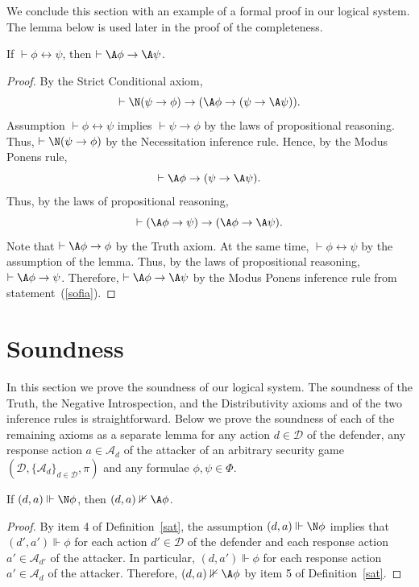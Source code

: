 \documentclass[letterpaper]{article}
\begin{document}
We conclude this section with an example of a formal proof in our logical system. The lemma below is used later in the proof of the completeness.

\begin{lemma}\label{biconditional lemma}
If $\vdash\phi\leftrightarrow\psi$, then $\vdash\A\phi\to\A\psi$.
\end{lemma}
\begin{proof}
By the Strict Conditional axiom,
$$
\vdash \N(\psi\to\phi)\to(\A\phi\to(\psi\to \A\psi)).
$$
Assumption  $\vdash \phi\leftrightarrow \psi$ implies $\vdash \psi\to \phi$ by the laws of propositional reasoning. Thus, $\vdash \N(\psi\to \phi)$ by the Necessitation inference rule. Hence, by the Modus Ponens rule,
$$
\vdash \A\phi\to(\psi\to \A\psi).
$$
Thus, by the laws of propositional reasoning,
\begin{equation}\label{sofia}
\vdash (\A\phi\to\psi)\to (\A\phi\to \A\psi).
\end{equation}
Note that $\vdash \A\phi\to\phi$ by the Truth axiom. At the same time, $\vdash \phi\leftrightarrow \psi$ by the assumption of the lemma. Thus, by the laws of propositional reasoning, $\vdash \A\phi\to\psi$. Therefore,
$
\vdash \A\phi\to \A\psi
$
by the Modus Ponens inference rule from statement~(\ref{sofia}).
\end{proof}

\section{Soundness}

In this section we prove the soundness of our logical system. The soundness of the Truth, the Negative Introspection, and the Distributivity axioms and of the two inference rules is straightforward. Below we prove the soundness of each of the remaining axioms as a separate lemma for any action $d\in\mathcal{D}$ of the defender, any response action $a\in\mathcal{A}_d$ of the attacker of an arbitrary security game $(\mathcal{D},\{\mathcal{A}_d\}_{d\in\mathcal{D}},\pi)$ and any formulae $\phi,\psi\in\Phi$.

\begin{lemma}
If $(d,a)\Vdash \N\phi$, then $(d,a)\nVdash\A\phi$.
\end{lemma}
\begin{proof}
By item 4 of Definition~\ref{sat}, the assumption $(d,a)\Vdash \N\phi$ implies that $(d',a')\Vdash\phi$ for each action $d'\in\mathcal{D}$ of the defender and each response action $a'\in\mathcal{A}_{d'}$ of the attacker. In particular, $(d,a')\Vdash\phi$ for each response action $a'\in\mathcal{A}_{d}$ of the attacker. Therefore, $(d,a)\nVdash\A\phi$ by item 5 of Definition~\ref{sat}.
\end{proof}
\end{document}
